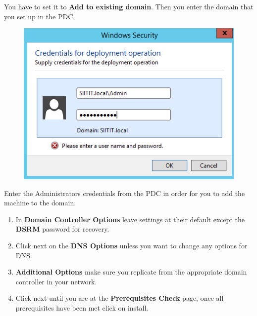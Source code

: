 \documentclass{article}
\begin{document}
You have to set it to \textbf{Add to existing domain}. Then you enter the domain that you set up in the PDC. 
\newpage
\begin{figure}[h]
	\centering
	\includegraphics[width=.4\linewidth, height=.2\textheight]{BDC/2}
\end{figure}
Enter the Administrators credentials from the PDC in order for you to add the machine to the domain.
\begin{enumerate}
	\item In \textbf{Domain Controller Options} leave settings at their default except the \textbf{DSRM} password for recovery.
	\item Click next on the \textbf{DNS Options} unless you want to change any options for DNS.
	\item \textbf{Additional Options} make sure you replicate from the appropriate domain controller in your network.
	\item Click next until you are at the \textbf{Prerequisites Check} page, once all prerequisites have been met click on install.
\end{enumerate}
\end{document}
